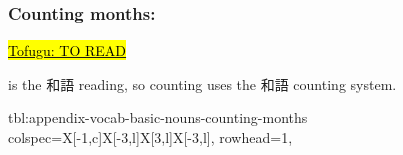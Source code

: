 \documentclass[../nihongo-gakushuu-kyouzai.tex]{subfiles}
\begin{document}
\subsubsection{Counting months: }
\href{https://www.tofugu.com/japanese/japanese-counter-tsuki-gatsu-getsu/}{\hl{Tofugu: TO READ}}

 is the 和語 reading, so counting uses the 和語 counting system.

{tbl:appendix-vocab-basic-nouns-counting-months}  %
{
    colspec={X[-1,c]X[-3,l]X[3,l]X[-3,l]},
    rowhead=1,
}  %
\end{document}
